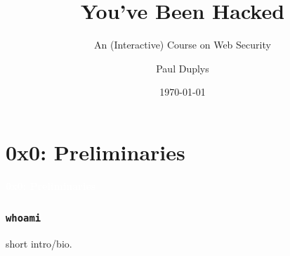 \documentclass[aspectratio=169]{beamer}
\title{You've Been Hacked}
\subtitle{An (Interactive) Course on Web Security}
\author{Paul Duplys}
\institute[]{@duplys}
\date{\today}
\begin{document}
\begin{frame}
    \titlepage
\end{frame}

\begin{frame}
    \tableofcontents
\end{frame}

\section{0x0: Preliminaries}

{
\begin{frame}
\huge{\textcolor{white}{\textbf{0x0: Preliminaries}}}
\end{frame}
}

\begin{frame}
    \frametitle{\texttt{whoami}}
    short intro/bio.
\end{frame}
\end{document}
